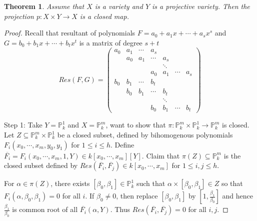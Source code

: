 \documentclass{ctexart}
\newtheorem{theorem}{Theorem}[section]
\begin{document}
\begin{theorem}
    Assume that $X$ is a variety and $Y$ is a projective variety.
    Then the projection $p: X \times Y \rightarrow X$ is a closed map.
    \label{Theorem 3.3}
\end{theorem}
\begin{proof}
    Recall that resultant of polynomials $F = a_{0} + a_{1}x + \cdots + a_{s}x^{s}$ and $G = b_{0} + b_{1}x + \cdots + b_{t}x^{t}$ is a matrix of degree $s + t$
    \begin{equation}
        Res(F, G) = 
        \begin{pmatrix}
            a_{0} & a_{1} & \cdots & a_{s} &&& \\
            & a_{0} & a_{1} & \cdots & a_{s} && \\
            &&&& \ddots && \\
            &&& a_{0} & a_{1} & \cdots & a_{s} \\
            b_{0} & b_{1} & \cdots & b_{t} &&& \\
            & b_{0} & b_{1} & \cdots & b_{t} && \\
            &&&& \ddots && \\
            &&& b_{0} & b_{1} & \cdots & b_{t}
        \end{pmatrix}
    \end{equation}
    \par
    Step 1: Take $Y = \mathbb{P}_{k}^{1}$ and $X = \mathbb{P}_{k}^{m}$, want to show that $\pi: \mathbb{P}_{k}^{m} \times \mathbb{P}_{k}^{1} \rightarrow \mathbb{P}_{k}^{m}$ is closed.
    Let $Z \subseteq \mathbb{P}_{k}^{m} \times \mathbb{P}_{k}^{1}$ be a closed subset, defined by bihomogenous polynomials $F_{i}(x_{0}, \cdots, x_{m}, y_{0}, y_{1})$ for $1 \le i \le h$. 
    Define $\overline{F_{i}} = F_{i}(x_{0}, \cdots, x_{m}, 1, Y)\in k[x_{0}, \cdots, x_{m}][Y]$.
    Claim that $\pi(Z) \subseteq \mathbb{P}_{k}^{m}$ is the closed subset defined by $Res(\overline{F_{i}}, \overline{F_{j}})\in k[x_{0}, \cdots, x_{m}]$ for $1 \le i,j \le h$.
    \par
    For $\alpha\in \pi(Z)$, there exists $[\beta_{0}, \beta_{1}]\in \mathbb{P}_{k}^{1}$ such that $\alpha \times [\beta_{0}, \beta_{1}]\in Z$ so that $F_{i}(\alpha, \beta_{0}, \beta_{1}) = 0$ for all $i$.
    If $\beta_{0} \neq 0$, then replace $[\beta_{0}, \beta_{1}]$ by $[1, \frac{\beta_{1}}{\beta_{0}}]$ and hence $\frac{\beta_{1}}{\beta_{0}}$ is common root of all $\overline{F_{i}}(\alpha, Y)$.
    Thus $Res(\overline{F_{i}}, \overline{F_{j}}) = 0$ for all $i,j$.

\end{proof}
\end{document}

